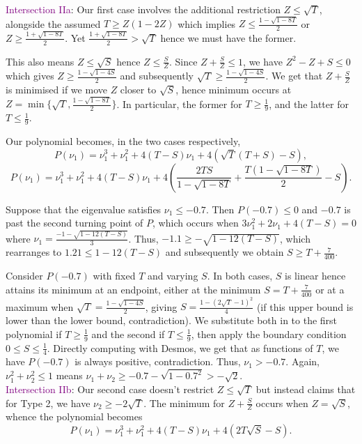 \documentclass[11pt]{article}
\newcommand{\purp}[1]{\textcolor{purple}{#1}}
\begin{document}
\purp{Intersection IIa}: Our first case involves the additional restriction $Z \le \sqrt{T}$, alongside the assumed $T \ge Z(1-2Z)$ which implies $Z \le \frac{1 - \sqrt{1-8T}}{2}$ or $Z \ge \frac{1+\sqrt{1-8T}}{2}$. Yet $\frac{1+\sqrt{1-8T}}{2} > \sqrt{T}$ hence we must have the former.

This also means $Z \le \sqrt{S}$ hence $Z \le \frac{S}{Z}$. Since $Z + \frac{S}{Z} \le 1$, we have $Z^2 - Z + S \le 0$ which gives $Z \ge \frac{1-\sqrt{1-4S}}{2}$ and subsequently $\sqrt{T} \ge \frac{1-\sqrt{1-4S}}{2}$. We get that $Z + \frac{S}{Z}$ is minimised if we move $Z$ closer to $\sqrt{S}$, hence minimum occurs at $Z = \min\{\sqrt{T}, \frac{1-\sqrt{1-8T}}{2}\}$. In particular, the former for $T \ge \frac19$, and the latter for $T \le \frac19$. 

Our polynomial becomes, in the two cases respectively,
\[P(\nu_1) = \nu_1^3 + \nu_1^2 + 4(T-S)\nu_1 + 4(\sqrt{T}(T + S) - S),\]
\[P(\nu_1) = \nu_1^3 + \nu_1^2 + 4(T-S)\nu_1 + 4\left(\frac{2TS}{1-\sqrt{1-8T}} + \frac{T(1-\sqrt{1-8T})}{2} - S\right).\]

Suppose that the eigenvalue satisfies $\nu_1 \le -0.7$. Then $P(-0.7) \le 0$ and $-0.7$ is past the second turning point of $P$, which occurs when $3\nu_1^2 + 2\nu_1 + 4(T-S) = 0$ where $\nu_1 = \frac{-1-\sqrt{1-12(T-S)}}{3}$. Thus, $-1.1 \ge -\sqrt{1-12(T-S)}$, which rearranges to $1.21 \le 1-12(T-S)$ and subsequently we obtain $S \ge T + \frac{7}{400}$. 

Consider $P(-0.7)$ with fixed $T$ and varying $S$. In both cases, $S$ is linear hence attains its minimum at an endpoint, either at the minimum $S = T + \frac{7}{400}$ or at a maximum when $\sqrt{T} = \frac{1-\sqrt{1-4S}}{2}$, giving $S = \frac{1 - (2\sqrt{T}-1)^2}{4}$ (if this upper bound is lower than the lower bound, contradiction). We substitute both in to the first polynomial if $T \ge \frac19$ and the second if $T \le \frac19$, then apply the boundary condition $0 \le S \le \frac14$. Directly computing with Desmos, we get that as functions of $T$, we have $P(-0.7)$ is always positive, contradiction. Thus, $\nu_1 > -0.7$. Again, $\nu_1^2 + \nu_2^2 \le 1$ means $\nu_1 + \nu_2 \ge -0.7 - \sqrt{1-0.7^2} > -\sqrt{2}$. \\

\purp{Intersection IIb}: Our second case doesn't restrict $Z \le \sqrt{T}$ but instead claims that for Type 2, we have $\nu_2 \ge -2\sqrt{T}$. The minimum for $Z + \frac{S}{Z}$ occurs when $Z = \sqrt{S}$, whence the polynomial becomes
\[P(\nu_1) = \nu_1^3 + \nu_1^2 + 4(T-S)\nu_1 + 4(2T\sqrt{S} - S).\]
\end{document}
